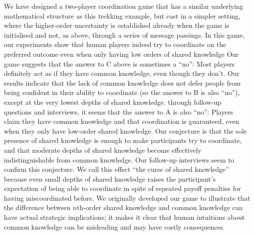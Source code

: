 We have designed a two-player coordination game that has a similar underlying mathematical structure as this trekking example, but cast in a simpler setting, where the higher-order uncertainty is established already when the game is initialised and not, as above, through a series of message passings. In this game, our experiments show that human players indeed try to coordinate on the preferred outcome even when only having low orders of shared knowledge Our game suggests that the answer to C above is sometimes a ``no'': Most players definitely act as if they have common knowledge, even though they don't. Our results indicate that the lack of common knowledge does not defer people from being confident in their ability to coordinate (so the answer to B is also ``no''), except at the very lowest depths of shared knowledge.  through follow-up questions and interviews, it seems that the answer to A is also ``no'': Players claim they have common knowledge and that coordination is guaranteed, even when they only have low-order shared knowledge. Our conjecture is that the sole presence of shared knowledge is enough to make participants try to coordinate, and that moderate depths of shared knowledge become effectively indistinguishable from common knowledge. Our follow-up interviews seem to confirm this conjecture. We call this effect ``the curse of shared knowledge'' because even small depths of shared knowledge raises the participant's expectation of being able to coordinate in spite of repeated payoff penalties for having miscoordinated before. We originally developed our game to illustrate that the difference between $n$th-order shared knowledge and common knowledge can have actual strategic implications; it makes it clear that human intuitions about common knowledge can be misleading and may have costly consequences.

